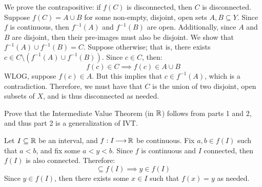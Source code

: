 \vspace{-0.2in}
\begin{soln}
    We prove the contrapositive: if $ f(C) $ is disconnected, then $ C $ is
    disconnected. \vsp
    Suppose $ f(C) = A \cup B $ for some non-empty, disjoint, open sets $ A, B
    \subseteq Y $. Since $ f $ is continuous, then $ f^{-1}(A) $ and
    $ f^{-1}(B) $ are open. Additionally, since $ A $ and $ B $ are disjoint,
    then their pre-images must also be disjoint. We show that $ f^{-1}(A) \cup
    f^{-1}(B) = C $. \vsp
    Suppose otherwise; that is, there exists $ c \in C \setminus (f^{-1}(A)
    \cup f^{-1}(B)) $. Since $ c \in C $, then:
    \begin{equation*}
        f(c) \in C \implies f(c) \in A \cup B
    \end{equation*}
    WLOG, suppose $ f(c) \in A $.
    But this implies that $ c \in f^{-1}(A) $, which is a contradiction.
    Therefore, we must have that $ C $ is the union of two disjoint, open
    subsets of $ X $, and is thus disconnected as needed.
\end{soln}

\vspace{-0.15in}
\begin{qu}[num=12.3]
    Prove that the Intermediate Value Theorem (in $ \mathbb{R} $) follows from parts
    1 and 2, and thus part 2 is a generalization of IVT.
\end{qu}

\vspace{-0.15in}
\begin{soln}
    Let $ I \subseteq \mathbb{R} $ be an interval, and $ f : I \operatorname{\longrightarrow} \mathbb{R} $
    be continuous.
    Fix $ a, b \in f(I) $ such that $ a < b $, and fix some $ a < y < b $. \vsp
    Since $ f $ is continuous and $ I $ connected, then $ f(I) $ is also
    connected. Therefore:
    \begin{equation*}
        [a, b] \subseteq f(I) \implies y \in f(I)
    \end{equation*}
    Since $ y \in f(I) $, then there exists some $ x \in I $ such that
    $ f(x) = y $ as needed.
\end{soln}


